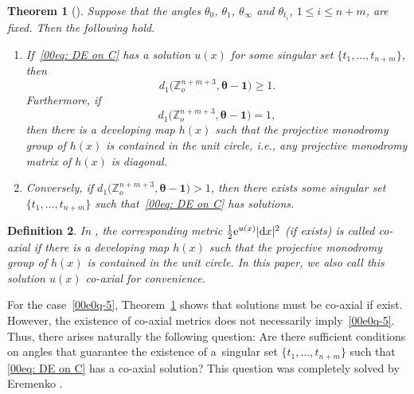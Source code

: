 \documentclass[10pt,a4paper]{amsart}
\numberwithin{equation}{section}
\newtheorem{Theorem}{Theorem}[section]
\newtheorem{Definition}[Theorem]{Definition}
\def\Z{\mathbb Z}
\begin{document}
\begin{Theorem}[{\cite{Mondello-Panov}}]\label{thm-MP}
 Suppose that the angles $\theta_0$, $\theta_1$, $\theta_\infty$ and
 $\theta_{t_i}$, $1\le i\le n+m$, are fixed. Then the following
 hold.
\begin{enumerate}\itemsep=0pt
\item[$1.$]
If~\eqref{00eq: DE on C} has a solution $u(x)$ for some singular set $\{t_1,\dots,t_{n+m}\}$, then
\[d_1\bigl(\Z_o^{n+m+3},{\boldsymbol\theta-\boldsymbol 1}\bigr)\geq 1.\]
Furthermore, if
 \begin{equation}\label{00e0q-5}
d_1\bigl(\Z_o^{n+m+3},{\boldsymbol\theta-\boldsymbol 1}\bigr)=1,
\end{equation}
then there is a developing map $h(x)$ such that the projective
monodromy group of $h(x)$ is contained in the unit circle, i.e., any
projective monodromy matrix of $h(x)$ is diagonal.

\item[$2.$]
Conversely, if $d_1\bigl(\Z_o^{n+m+3},{\boldsymbol\theta-\boldsymbol 1}\bigr)>1$, then there exists some singular set $\{t_1,\dots, t_{n+m}\}$ such that~\eqref{00eq: DE on C} has solutions.
\end{enumerate}
\end{Theorem}

\begin{Definition}
In \cite{Mondello-Panov}, the corresponding metric
$\frac12{\rm e}^{u(x)}|{\rm d}x|^2$ (if exists) is called \emph{co-axial} if there
is a developing map $h(x)$ such that the projective monodromy group of
$h(x)$ is contained in the unit circle. In this paper, we also call
this solution $u(x)$ \emph{co-axial} for convenience.
\end{Definition}

For the case~\eqref{00e0q-5}, Theorem~\ref{thm-MP} shows that solutions must be
co-axial if exist. However, the existence of co-axial metrics does not
necessarily imply~\eqref{00e0q-5}. Thus, there arises naturally the
following question: Are there sufficient conditions on angles that
guarantee the existence of a~singular set $\{t_1,\dots,t_{n+m}\}$ such that
\eqref{00eq: DE on C} has a co-axial solution? This question was
completely solved by Eremenko \cite{Coaxial}.
\end{document}
